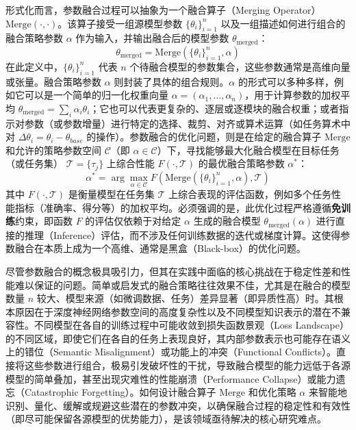 \documentclass[../main.tex]{subfiles}
\begin{document}
形式化而言，参数融合过程可以抽象为一个融合算子（Merging Operator） $\text{Merge}(\cdot, \cdot)$。该算子接受一组源模型参数 $\{\theta_i\}_{i=1}^n$ 以及一组描述如何进行组合的融合策略参数 $\alpha$ 作为输入，并输出融合后的模型参数 $\theta_\mathrm{merged}$：
\begin{equation}
	\theta_\mathrm{merged} = \text{Merge}(\{\theta_i\}_{i=1}^n, \alpha) \label{eq:merge_operator}
\end{equation}
在此定义中，$\{\theta_i\}_{i=1}^n$ 代表 $n$ 个待融合模型的参数集合，这些参数通常是高维向量或张量。融合策略参数 $\alpha$ 则封装了具体的组合规则。$\alpha$ 的形式可以多种多样，例如它可以是一个简单的归一化权重向量 $\alpha = (\alpha_1, \dots, \alpha_n)$，用于计算参数的加权平均 $\theta_\mathrm{merged} = \sum_i \alpha_i \theta_i$；它也可以代表更复杂的、逐层或逐模块的融合权重；或者指示对参数（或参数增量）进行特定的选择、裁剪、对齐或算术运算（如任务算术中对 $\Delta \theta_i = \theta_i - \theta_{base}$ 的操作）。参数融合的优化问题，则是在给定的融合算子 $\text{Merge}$ 和允许的策略参数空间 $\mathcal{C}$（即 $\alpha \in \mathcal{C}$）下，寻找能够最大化融合模型在目标任务（或任务集） $\mathcal{T} = \{\tau_j\}$ 上综合性能 $F(\cdot, \mathcal{T})$ 的最优融合策略参数 $\alpha^*$：
\begin{equation}
	\alpha^* = \arg\max_{\alpha \in \mathcal{C}} F(\text{Merge}(\{\theta_i\}_{i=1}^n, \alpha), \mathcal{T}) \label{eq:merge_objective}
\end{equation}
其中 $F(\cdot, \mathcal{T})$ 是衡量模型在任务集 $\mathcal{T}$ 上综合表现的评估函数，例如多个任务性能指标（准确率、得分等）的加权平均。必须强调的是，此优化过程严格遵循\textbf{免训练}约束，即函数 $F$ 的评估仅依赖于对给定 $\alpha$ 生成的融合模型 $\theta_\mathrm{merged}(\alpha)$ 进行直接的推理（Inference）评估，而不涉及任何训练数据的迭代或梯度计算。这使得参数融合在本质上成为一个高维、通常是黑盒（Black-box）的优化问题。

尽管参数融合的概念极具吸引力，但其在实践中面临的核心挑战在于稳定性差和性能难以保证的问题。简单或启发式的融合策略往往效果不佳，尤其是在融合的模型数量 $n$ 较大、模型来源（如微调数据、任务）差异显著（即异质性高）时。其根本原因在于深度神经网络参数空间的高度复杂性以及不同模型知识表示的潜在不兼容性。不同模型在各自的训练过程中可能收敛到损失函数景观（Loss Landscape）的不同区域，即使它们在各自的任务上表现良好，其内部参数表示也可能存在语义上的错位（Semantic Misalignment）或功能上的冲突（Functional Conflicts）。直接将这些参数进行组合，极易引发破坏性的干扰，导致融合模型的能力远低于各源模型的简单叠加，甚至出现灾难性的性能崩溃（Performance Collapse）或能力遗忘（Catastrophic Forgetting）。如何设计融合算子 $\text{Merge}$ 和优化策略 $\alpha$ 来智能地识别、量化、缓解或规避这些潜在的参数冲突，以确保融合过程的稳定性和有效性（即尽可能保留各源模型的优势能力），是该领域亟待解决的核心研究难点。
\end{document}
